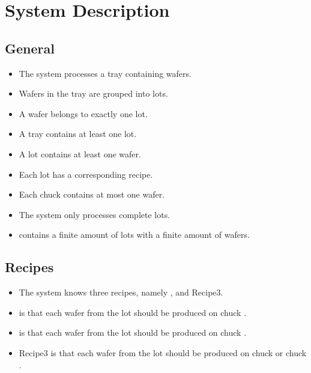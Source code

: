 \section{System Description}

\subsection{General}
\begin{itemize}
    \item The system processes a tray containing wafers.
    \item Wafers in the tray are grouped into lots.
    \item A wafer belongs to exactly one lot.
    \item A tray contains at least one lot.
    \item A lot contains at least one wafer.
    \item Each lot has a corresponding recipe.
    \item Each chuck contains at most one wafer.
    \item The system only processes complete lots.
    \item \tray contains a finite amount of lots with a finite amount of wafers.
\end{itemize}

\subsection{Recipes}
\begin{itemize}
    \item The system knows three recipes, namely \recipeOne, \recipeTwo and Recipe3.
    \item \recipeOne is that each wafer from the lot should be produced on chuck \chuckA.
    \item \recipeTwo is that each wafer from the lot should be produced on chuck \chuckB.
    \item Recipe3 is that each wafer from the lot should be produced on chuck \chuckA or chuck \chuckB.
\end{itemize}

